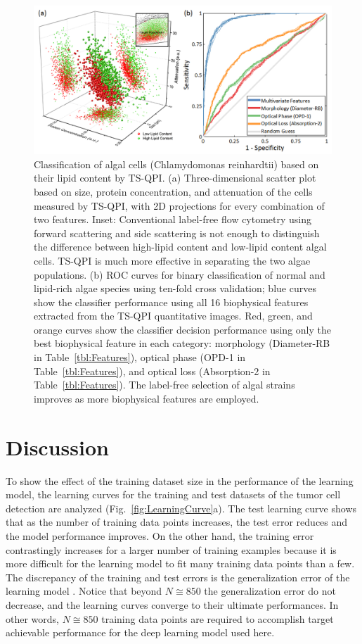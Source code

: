 \documentclass[aps,pra,reprint,superscriptaddress]{revtex4-1}
\begin{document}
\begin{figure}
\includegraphics[scale=0.8]{FigureAlgae.jpg}
\caption{\label{fig:AlgaeScatter} Classification of algal cells (Chlamydomonas reinhardtii) based on their lipid content by TS-QPI. (a) Three-dimensional scatter plot based on size, protein concentration, and attenuation of the cells measured by TS-QPI, with 2D projections for every combination of two features. Inset: Conventional label-free flow cytometry using forward scattering and side scattering is not enough to distinguish the difference between high-lipid content and low-lipid content algal cells. TS-QPI is much more effective in separating the two algae populations. (b) ROC curves for binary classification of normal and lipid-rich algae species using ten-fold cross validation; blue curves show the classifier performance using all 16 biophysical features extracted from the TS-QPI quantitative images. Red, green, and orange curves show the classifier decision performance using only the best biophysical feature in each category: morphology (Diameter-RB in Table~\ref{tbl:Features}), optical phase (OPD-1 in Table~\ref{tbl:Features}), and optical loss (Absorption-2 in Table~\ref{tbl:Features}). The label-free selection of algal strains improves as more biophysical features are employed.}
\end{figure}

\section*{Discussion}

To show the effect of the training dataset size in the performance of the learning model, the learning curves for the training and test datasets of the tumor cell detection are analyzed (Fig.~\ref{fig:LearningCurve}a). The test learning curve shows that as the number of training data points increases, the test error reduces and the model performance improves. On the other hand, the training error contrastingly increases for a larger number of training examples because it is more difficult for the learning model to fit many training data points than a few. The discrepancy of the training and test errors is the generalization error of the learning model \cite{abu2012learning}. Notice that beyond $N \cong 850$ the generalization error do not decrease, and the learning curves converge to their ultimate performances. In other words, $N \cong 850$ training data points are required to accomplish target achievable performance for the deep learning model used here.
\end{document}
